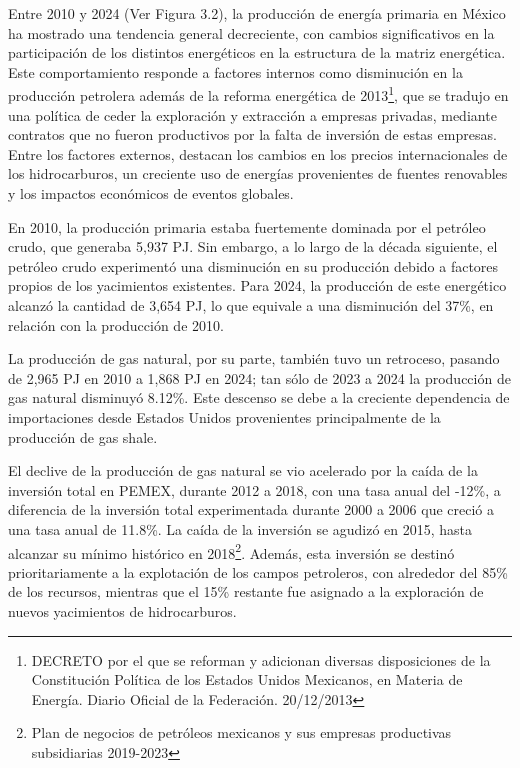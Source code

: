 \documentclass{sener2025}
\begin{document}
Entre 2010 y 2024 (Ver Figura 3.2), la producción de energía primaria en México ha mostrado una tendencia general decreciente, con cambios significativos en la participación de los distintos energéticos en la estructura de la matriz energética. Este comportamiento responde a factores internos como disminución en la producción petrolera además de la reforma energética de 2013\footnote{DECRETO por el que se reforman y adicionan diversas disposiciones de la Constitución Política de los Estados Unidos Mexicanos, en Materia de Energía. Diario Oficial de la Federación. 20/12/2013}, que se tradujo en una política de ceder la exploración y extracción a empresas privadas, mediante contratos que no fueron productivos por la falta de inversión de estas empresas. Entre los factores externos, destacan los cambios en los precios internacionales de los hidrocarburos, un creciente uso de energías provenientes de fuentes renovables y los impactos económicos de eventos globales.


En 2010, la producción primaria estaba fuertemente dominada por el petróleo crudo, que generaba 5,937 PJ. Sin embargo, a lo largo de la década siguiente, el petróleo crudo experimentó una disminución en su producción debido a factores propios de los yacimientos existentes. Para 2024, la producción de este energético alcanzó la cantidad de 3,654 PJ, lo que equivale a una disminución del 37\%, en relación con la producción de 2010.

La producción de gas natural, por su parte, también tuvo un retroceso, pasando de 2,965 PJ en 2010 a 1,868 PJ en 2024; tan sólo de 2023 a 2024 la producción de gas natural disminuyó 8.12\%. Este descenso se debe a la creciente dependencia de importaciones desde Estados Unidos provenientes principalmente de la producción de gas shale.

El declive de la producción de gas natural se vio acelerado por la caída de la inversión total en PEMEX, durante 2012 a 2018, con una tasa anual del -12\%, a diferencia de la inversión total experimentada durante 2000 a 2006 que creció a una tasa anual de 11.8\%. La caída de la inversión se agudizó en 2015, hasta alcanzar su mínimo histórico en 2018\footnote{Plan de negocios de petróleos mexicanos y sus empresas productivas subsidiarias 2019-2023}. Además, esta inversión se destinó prioritariamente a la explotación de los campos petroleros, con alrededor del 85\% de los recursos, mientras que el 15\% restante fue asignado a la exploración de nuevos yacimientos de hidrocarburos.
\end{document}
